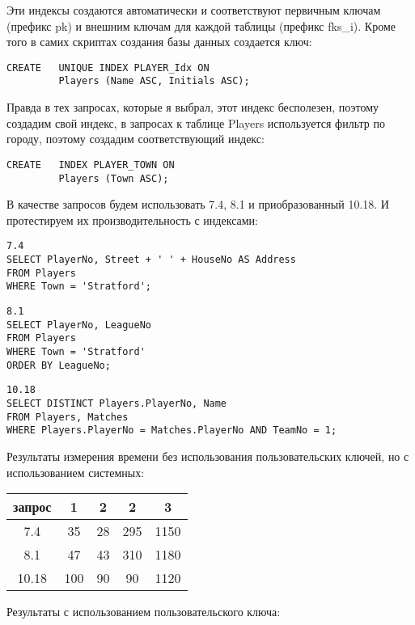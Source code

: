 \documentclass[a4paper,12pt]{article}
\begin{document}
Эти индексы создаются автоматически и соответствуют первичным ключам (префикс pk) и внешним ключам для каждой таблицы (префикс fks\_i).
Кроме того в самих скриптах создания базы данных создается ключ:

\begin{lstlisting}
CREATE   UNIQUE INDEX PLAYER_Idx ON
         Players (Name ASC, Initials ASC);
\end{lstlisting}

Правда в тех запросах, которые я выбрал, этот индекс бесполезен, поэтому создадим свой индекс, в запросах к таблице Players используется фильтр по городу, поэтому создадим соответствующий индекс:

\begin{lstlisting}
CREATE   INDEX PLAYER_TOWN ON
         Players (Town ASC);
\end{lstlisting}

В качестве запросов будем использовать 7.4, 8.1 и приобразованный 10.18. И протестируем их производительность с индексами:

\begin{lstlisting}
7.4
SELECT PlayerNo, Street + ' ' + HouseNo AS Address
FROM Players
WHERE Town = 'Stratford';
\end{lstlisting}

\begin{lstlisting}
8.1
SELECT PlayerNo, LeagueNo
FROM Players
WHERE Town = 'Stratford'
ORDER BY LeagueNo;
\end{lstlisting}

\begin{lstlisting}
10.18
SELECT DISTINCT Players.PlayerNo, Name
FROM Players, Matches
WHERE Players.PlayerNo = Matches.PlayerNo AND TeamNo = 1;
\end{lstlisting}

Результаты измерения времени без использования пользовательских ключей, но с использованием системных:

\begin{tabular}[t]{|c|c|c|c|c|}
\hline
запрос   & 1   & 2  & 2   & 3 \\
\hline
7.4      & 35  & 28 & 295 & 1150 \\
\hline
8.1      & 47  & 43 & 310 & 1180 \\
\hline
10.18    & 100 & 90 & 90  & 1120 \\
\hline
\end{tabular}

Результаты с использованием пользовательского ключа:
\end{document}
